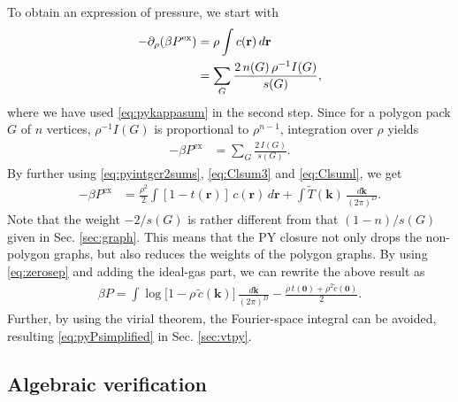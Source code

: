 \documentclass[preprint]{revtex4-1}
\newcommand{\vct}[1]{\mathbf{#1}}
\providecommand{\vr}{} %
\renewcommand{\vr}{\vct{r}}
\newcommand{\vk}{\vct{k}}
\newcommand{\dvk}{\frac{d\vk}{(2\pi)^D}}
\newcommand{\supex}[1]{ { { #1 }^{ \mathrm{ex} } } }
\newcommand{\Pex}{\supex{P}}
\begin{document}
%
To obtain an expression of pressure,
  we start with\cite{hansen}
%
\begin{align}
  -\partial_\rho (\beta \Pex)
  &= \rho \int c(\vr) \, d\vr
  \notag \\
  &= \sum_{G} \frac{ 2 \, n(G) \, \rho^{-1} I(G) }{ s(G) },
\label{eq:crcompr}
\end{align}
where
we have used \eqref{eq:pykappasum} in the second step.
%
%
Since for a polygon pack $G$ of $n$ vertices, $\rho^{-1} I(G)$
  is proportional to $\rho^{n-1}$,
%
integration over $\rho$ yields\cite{baxterpressure}
%
\begin{align}
      -\beta \Pex
  &=  \sum_{G} \frac{ 2 \, I(G) }{ s(G) }.
  \label{eq:pyPgraph}
\end{align}
%
By further using
\eqref{eq:pyintgcr2sums}, \eqref{eq:Clsum3} and \eqref{eq:Clsuml},
we get
%
\begin{align}
      -\beta \Pex
  &=   \frac{ \rho^2 }{ 2 }
    \int [1 - t(\vr)]\, c(\vr) \, d\vr
      +\int \tilde{T}(\vk) \, \dvk.
\label{eq:baxterpressure}
\end{align}
%
Note that the weight $-2/s(G)$ is rather different
  from that $(1-n)/s(G)$ given in Sec. \ref{sec:graph}.
%
This means that the PY closure not only drops the non-polygon graphs,
  but also reduces the weights of the polygon graphs.
%
By using \eqref{eq:zerosep} and adding the ideal-gas part,
  we can rewrite the above result as
%
\begin{align*}
      \beta P
    =
      \int \log\big[1 - \rho \, \tilde{c}(\vk)\big] \, \dvk
      -\frac{ \rho \, t(\vct{0}) + \rho^2 \tilde{c}(\vct0) }{2}.
\end{align*}
%
Further, by using the virial theorem,
the Fourier-space integral can be avoided,
resulting \eqref{eq:pyPsimplified} in Sec. \ref{sec:vtpy}.



\subsection{Algebraic verification}
\end{document}
